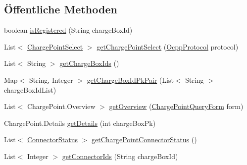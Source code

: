 \subsection*{Öffentliche Methoden}
\begin{DoxyCompactItemize}
\item 
boolean \hyperlink{classde_1_1rwth_1_1idsg_1_1steve_1_1repository_1_1impl_1_1_charge_point_repository_impl_a3339d81256f10707163f9a73c7f98a26}{is\-Registered} (String charge\-Box\-Id)
\item 
List$<$ \hyperlink{classde_1_1rwth_1_1idsg_1_1steve_1_1repository_1_1dto_1_1_charge_point_select}{Charge\-Point\-Select} $>$ \hyperlink{classde_1_1rwth_1_1idsg_1_1steve_1_1repository_1_1impl_1_1_charge_point_repository_impl_a1d92ac9f5e6804fff149aa0d74e33834}{get\-Charge\-Point\-Select} (\hyperlink{enumde_1_1rwth_1_1idsg_1_1steve_1_1ocpp_1_1_ocpp_protocol}{Ocpp\-Protocol} protocol)
\item 
List$<$ String $>$ \hyperlink{classde_1_1rwth_1_1idsg_1_1steve_1_1repository_1_1impl_1_1_charge_point_repository_impl_a66ae0b99bb08e66ab8747035bdeded2c}{get\-Charge\-Box\-Ids} ()
\item 
Map$<$ String, Integer $>$ \hyperlink{classde_1_1rwth_1_1idsg_1_1steve_1_1repository_1_1impl_1_1_charge_point_repository_impl_a254d8de49274311c0ad2c36fdf0c066e}{get\-Charge\-Box\-Id\-Pk\-Pair} (List$<$ String $>$ charge\-Box\-Id\-List)
\item 
List$<$ Charge\-Point.\-Overview $>$ \hyperlink{classde_1_1rwth_1_1idsg_1_1steve_1_1repository_1_1impl_1_1_charge_point_repository_impl_a0d4d669070321336cd2f330d95164f37}{get\-Overview} (\hyperlink{classde_1_1rwth_1_1idsg_1_1steve_1_1web_1_1dto_1_1_charge_point_query_form}{Charge\-Point\-Query\-Form} form)
\item 
Charge\-Point.\-Details \hyperlink{classde_1_1rwth_1_1idsg_1_1steve_1_1repository_1_1impl_1_1_charge_point_repository_impl_a9c3374afcb6220bcdaab9f6a131db3e4}{get\-Details} (int charge\-Box\-Pk)
\item 
List$<$ \hyperlink{classde_1_1rwth_1_1idsg_1_1steve_1_1repository_1_1dto_1_1_connector_status}{Connector\-Status} $>$ \hyperlink{classde_1_1rwth_1_1idsg_1_1steve_1_1repository_1_1impl_1_1_charge_point_repository_impl_aca1edb35d1d8d64bbb3f5c95521ecd5a}{get\-Charge\-Point\-Connector\-Status} ()
\item 
List$<$ Integer $>$ \hyperlink{classde_1_1rwth_1_1idsg_1_1steve_1_1repository_1_1impl_1_1_charge_point_repository_impl_a5f99db92fff3de6a0c79621a60142c98}{get\-Connector\-Ids} (String charge\-Box\-Id)

\end{DoxyCompactItemize}
